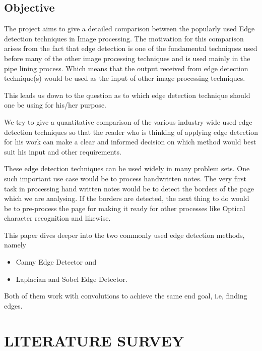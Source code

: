 \documentclass[BTech]{srmuthesis}
\begin{document}
\section{Objective}

The project aims to give a detailed comparison between the popularly used Edge detection techniques in Image processing. The motivation for this comparison arises from the fact that edge detection is one of the fundamental techniques used before many of the other image processing techniques and is used mainly in the pipe lining process. Which means that the output received from edge detection technique(s) would be used as the input of other image processing techniques.

This leads us down to the question as to which edge detection technique should one be using for his/her purpose.

We try to give a quantitative comparison of the various industry wide used edge detection techniques so that the reader who is thinking of applying edge detection for his work can make a clear and informed decision on which method would best suit his input and other requirements.

These edge detection techniques can be used widely in many problem sets. One such important use case would be to process handwritten notes. The very first task in processing hand written notes would be to detect the borders of the page which we are analysing. If the borders are detected, the next thing to do would be to pre-process the page for making it ready for other processes like Optical character recognition and likewise.

This paper dives deeper into the two
commonly used edge detection methods, namely

\begin{itemize}
    \item Canny Edge Detector and 
    \item Laplacian and Sobel Edge Detector.
\end{itemize}

 Both of them work with convolutions to achieve
the same end goal, i.e, finding edges. 

 \chapter{LITERATURE SURVEY}
\end{document}
